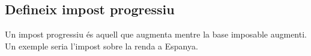 \subsection{Defineix impost progressiu}

Un impost progressiu és aquell que augmenta mentre la base imposable 
augmenti\cite{progressive_tax}. Un exemple seria l'impost sobre la renda
a Espanya.
